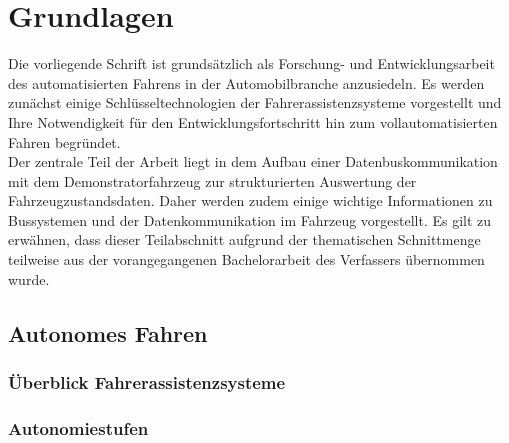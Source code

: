 \chapter{Grundlagen} \label{cha:grundlagen}
Die vorliegende Schrift ist grundsätzlich als Forschung- und Entwicklungsarbeit des automatisierten Fahrens in der Automobilbranche anzusiedeln. Es werden zunächst einige Schlüsseltechnologien der Fahrerassistenzsysteme vorgestellt und Ihre Notwendigkeit für den Entwicklungsfortschritt hin zum vollautomatisierten Fahren begründet.\\
Der zentrale Teil der Arbeit liegt in dem Aufbau einer Datenbuskommunikation mit dem Demonstratorfahrzeug zur strukturierten Auswertung der Fahrzeugzustandsdaten. Daher werden zudem einige wichtige Informationen zu Bussystemen und der Datenkommunikation im Fahrzeug vorgestellt. Es gilt zu erwähnen, dass dieser Teilabschnitt aufgrund der thematischen Schnittmenge teilweise aus der vorangegangenen Bachelorarbeit \cite{Kary.12.09.2016} des Verfassers übernommen wurde.


\section{Autonomes Fahren} \label{sec:AutonomesFahren}

\subsection{Überblick Fahrerassistenzsysteme} \label{subsec:FAS}
\lipsum[1-1]
\subsection{Autonomiestufen} \label{Autonomiestufen}%
\lipsum[1-1]


